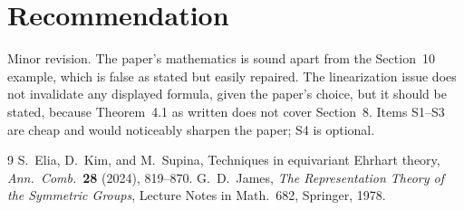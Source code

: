 \documentclass[12pt,letterpaper]{article}
\begin{document}
\section{Recommendation}
Minor revision.  The paper's mathematics is sound apart from the Section~10 example, which is false as stated but easily repaired.  The linearization issue does not invalidate any displayed formula, given the paper's choice, but it should be stated, because Theorem~4.1 as written does not cover Section~8.  Items S1--S3 are cheap and would noticeably sharpen the paper; S4 is optional.

\begin{thebibliography}{9}
 S.~Elia, D.~Kim, and M.~Supina, Techniques in equivariant Ehrhart theory, \emph{Ann.\ Comb.}\ \textbf{28} (2024), 819--870.
 G.~D.~James, \emph{The Representation Theory of the Symmetric Groups}, Lecture Notes in Math.\ 682, Springer, 1978.
\end{thebibliography}
\end{document}
